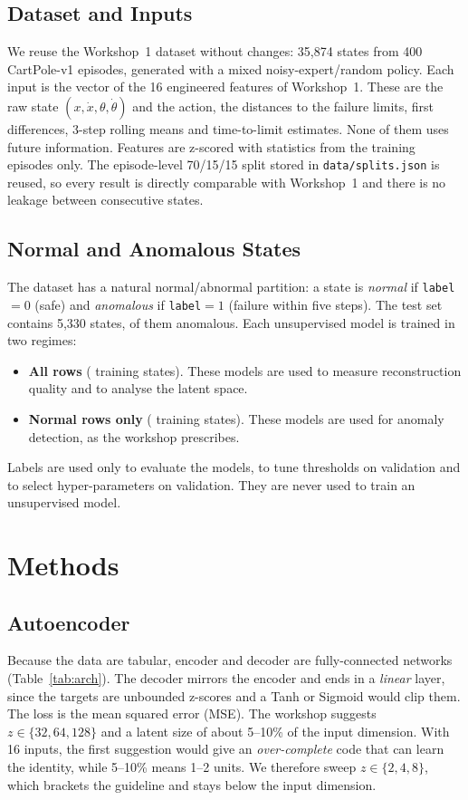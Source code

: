 \documentclass[conference]{IEEEtran}
\begin{document}
\subsection{Dataset and Inputs}
We reuse the Workshop~1 dataset without changes: 35,874 states from 400 CartPole-v1
episodes, generated with a mixed noisy-expert/random policy. Each input is the vector of the
16 engineered features of Workshop~1. These are the raw state $(x,\dot{x},\theta,\dot\theta)$
and the action, the distances to the failure limits, first differences, 3-step rolling means
and time-to-limit estimates. None of them uses future information. Features are z-scored
with statistics from the training episodes only. The episode-level 70/15/15 split stored in
\texttt{data/splits.json} is reused, so every result is directly comparable with
Workshop~1 and there is no leakage between consecutive states.

\subsection{Normal and Anomalous States}
The dataset has a natural normal/abnormal partition: a state is \emph{normal} if
\texttt{label}$=0$ (safe) and \emph{anomalous} if \texttt{label}$=1$ (failure within five
steps). The test set contains 5,330 states, \testAnomRate{} of them anomalous. Each
unsupervised model is trained in two regimes:
\begin{itemize}
\item \textbf{All rows} (\trainRowsAll{} training states). These models are used to measure
reconstruction quality and to analyse the latent space.
\item \textbf{Normal rows only} (\trainRowsNormal{} training states). These models are used
for anomaly detection, as the workshop prescribes.
\end{itemize}
Labels are used only to evaluate the models, to tune thresholds on validation and to select
hyper-parameters on validation. They are never used to train an unsupervised model.

\section{Methods}

\subsection{Autoencoder}
Because the data are tabular, encoder and decoder are fully-connected networks
(Table~\ref{tab:arch}). The decoder mirrors the encoder and ends in a \emph{linear} layer,
since the targets are unbounded z-scores and a Tanh or Sigmoid would clip them. The loss is
the mean squared error (MSE). The workshop suggests $z\in\{32,64,128\}$ and a latent size of
about 5--10\% of the input dimension. With 16 inputs, the first suggestion would give an
\emph{over-complete} code that can learn the identity, while 5--10\% means 1--2 units. We
therefore sweep $z\in\{2,4,8\}$, which brackets the guideline and stays below the input
dimension.
\end{document}

